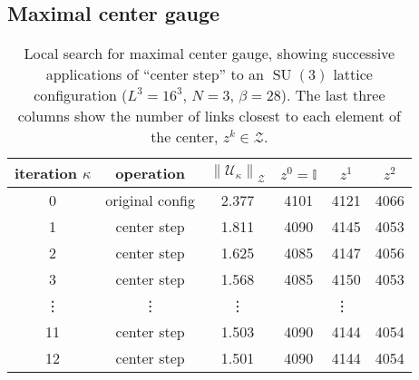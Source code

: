 \documentclass[preprint,aps,prd]{revtex4-2}
\newcommand{\zentrum}{\mathcal{Z}}       %
\newcommand{\config}{\mathcal{U}}
\DeclareMathOperator{\SU}{SU}
\newcommand\znorm[1]{\left\lVert #1 \right\rVert_\zentrum}
\begin{document}
\subsection{Maximal center gauge}

\begin{table}
  \caption{Local search for maximal center gauge,
    showing successive applications of ``center step'' to
    an $\SU(3)$ lattice configuration ($L^3=16^3$, $N=3$, $\beta=28$).
    The last three columns show the number of links closest
    to each element of the center, $z^k \in \zentrum$.
    \label{center1}}
  \begin{tabular}{c|c|c|ccc}
    iteration $\kappa$ & operation & $\znorm{\config_\kappa}$
     & $z^0=\mathbb{I}$ & $z^1$ & $z^2$ \\
    \hline
    0 & original config & 2.377 & 4101 & 4121 & 4066\\
    1 & center step     & 1.811 & 4090 & 4145 & 4053\\
    2 & center step     & 1.625 & 4085 & 4147 & 4056\\
    3 & center step     & 1.568 & 4085 & 4150 & 4053\\
    \vdots & \vdots & \vdots & \multicolumn{3}{c}{\vdots}\\
    11 & center step    & 1.503 & 4090 & 4144 & 4054\\
    12 & center step    & 1.501 & 4090 & 4144 & 4054\\
  \end{tabular}
\end{table}
\end{document}
